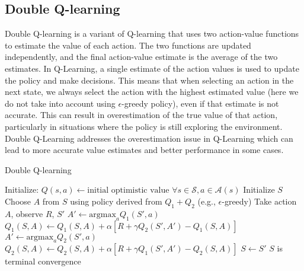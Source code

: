 \subsection{Double Q-learning}
Double Q-learning is a variant of Q-learning that uses two action-value functions to estimate the value of each action. The two functions are updated independently, and the final action-value estimate is the average of the two estimates. In Q-Learning, a single estimate of the action values is used to update the policy and make decisions. This means that when selecting an action in the next state, we always select the action with the highest estimated value (here we do not take into account using $\epsilon$-greedy policy), even if that estimate is not accurate. This can result in overestimation of the true value of that action, particularly in situations where the policy is still exploring the environment. Double Q-Learning addresses the overestimation issue in Q-Learning which can lead to more accurate value estimates and better performance in some cases.
\begin{algorithm}
\caption{Double Q-learning}\label{algo:DQL}
\begin{algorithmic}[1]
\State Initialize:
\State \hspace{0.5cm} $Q(s,a) \gets \text{initial optimistic value } \forall s\in \mathcal{S}, a\in \mathcal{A}(s)$
\Repeat
\State Initialize $S$
\Repeat
\State Choose $A$ from $S$ using policy derived from $Q_1+Q_2$ (e.g., $\epsilon$-greedy)
\State Take action $A$, observe $R$, $S'$
\State $A' \gets \text{argmax}_a Q_1(S',a)$
\State $Q_1(S,A) \gets Q_1(S,A) + \alpha [R + \gamma Q_2(S',A') - Q_1(S,A)]$
\Else
\State $A' \gets \text{argmax}_a Q_2(S',a)$
\State $Q_2(S,A) \gets Q_2(S,A) + \alpha [R + \gamma Q_1(S',A') - Q_2(S,A)]$
\EndIf
\State $S \gets S'$
\Until $S$ is terminal
\Until convergence
\end{algorithmic}
\end{algorithm}